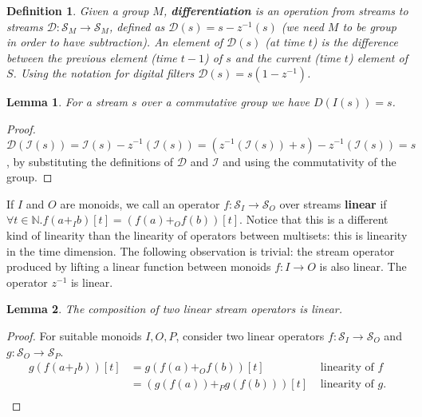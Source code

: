 \documentclass[10pt]{article}
\newtheorem{lemma}{Lemma}[section]
\newtheorem{definition}{Definition}[section]
\newcommand{\N}{\mathbb{N}}  %
\newcommand{\stream}[1]{\ensuremath{\mathcal{S}_{#1}}}
\newcommand{\zm}{\ensuremath{z^{-1}}} %
\newcommand{\I}{\mathcal{I}}  %
\newcommand{\D}{\mathcal{D}}  %
\begin{document}
\begin{definition}
Given a group $M$, \textbf{differentiation} is an operation from
streams to streams $\D : \stream{M} \rightarrow \stream{M}$, defined
as $\D(s) = s - \zm(s)$ (we need $M$ to be group in order to have
subtraction).  An element of $\D(s)$ (at time $t$) is the difference
between the previous element (time $t-1$) of $s$ and the current (time
$t$) element of $S$.  Using the notation for digital filters $\D(s) =
s(1 - \zm)$.

\end{definition}

\begin{lemma}
For a stream $s$ over a commutative group we have $D(I(s)) = s$.
\end{lemma}
\begin{proof}
$\D(\I(s)) = \I(s) - \zm(\I(s)) = (\zm(\I(s)) + s) - \zm(\I(s)) = s$, by
  substituting the definitions of $\D$ and $\I$ and using the
  commutativity of the group.
\end{proof}

If $I$ and $O$ are monoids, we call an operator $f: \stream{I}
\rightarrow \stream{O}$ over streams \textbf{linear} if $\forall t \in
\N . f(a +_I b)[t] = (f(a) +_O f(b))[t]$.  Notice that this is a
different kind of linearity than the linearity of operators between
multisets: this is linearity in the time dimension.  The following
observation is trivial: the stream operator produced by lifting a
linear function between monoids $f: I \rightarrow O$ is also linear.
The operator $\zm$ is linear.

\begin{lemma}
  The composition of two linear stream operators is linear.
\end{lemma}
\begin{proof}
  For suitable monoids $I, O, P$, consider two linear operators $f:
  \stream{I} \rightarrow \stream{O}$ and $g: \stream{O} \rightarrow
  \stream{P}$.
$$
\begin{aligned}
  g(f(a +_I b))[t] &= g(f(a) +_O f(b))[t] & \mbox{ linearity of }f \\
  &= (g(f(a)) +_P g(f(b)))[t] & \mbox{ linearity of }g. \\
\end{aligned}
$$
\end{proof}
\end{document}
